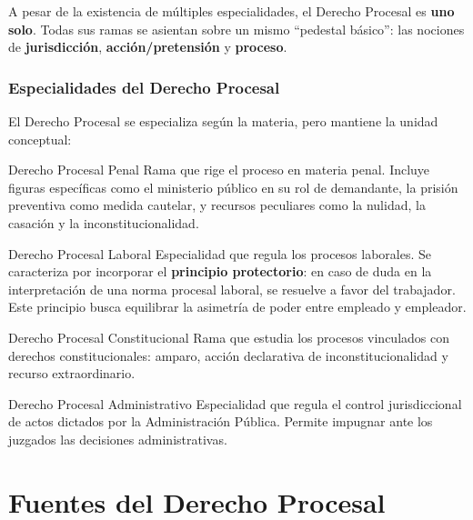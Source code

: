 \documentclass[12pt,oneside]{book}
\begin{document}
A pesar de la existencia de múltiples especialidades, el Derecho Procesal es \textbf{uno solo}. Todas sus ramas se asientan sobre un mismo ``pedestal básico'': las nociones de \textbf{jurisdicción}, \textbf{acción/pretensión} y \textbf{proceso}.

\subsection{Especialidades del Derecho Procesal}

El Derecho Procesal se especializa según la materia, pero mantiene la unidad conceptual:

\begin{definition}{Derecho Procesal Penal}
Rama que rige el proceso en materia penal. Incluye figuras específicas como el ministerio público en su rol de demandante, la prisión preventiva como medida cautelar, y recursos peculiares como la nulidad, la casación y la inconstitucionalidad.
\end{definition}

\begin{definition}{Derecho Procesal Laboral}
Especialidad que regula los procesos laborales. Se caracteriza por incorporar el \textbf{principio protectorio}: en caso de duda en la interpretación de una norma procesal laboral, se resuelve a favor del trabajador. Este principio busca equilibrar la asimetría de poder entre empleado y empleador.
\end{definition}

\begin{definition}{Derecho Procesal Constitucional}
Rama que estudia los procesos vinculados con derechos constitucionales: amparo, acción declarativa de inconstitucionalidad y recurso extraordinario.
\end{definition}

\begin{definition}{Derecho Procesal Administrativo}
Especialidad que regula el control jurisdiccional de actos dictados por la Administración Pública. Permite impugnar ante los juzgados las decisiones administrativas.
\end{definition}


\chapter{Fuentes del Derecho Procesal}
\end{document}

